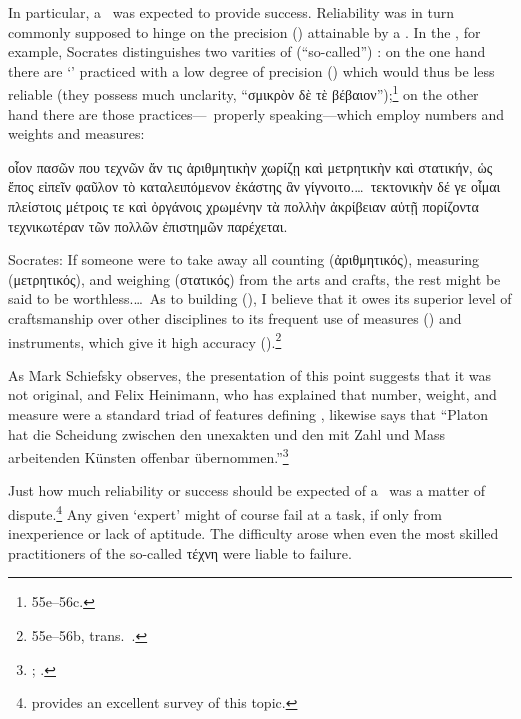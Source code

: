 \documentclass[11pt,letterpaper,oneside]{amsart} %
\begin{document}


In particular, a \techne\ was expected to provide  success. Reliability was in turn commonly supposed to hinge on the precision (\akribeia) attainable by a \techne. In the , for example, Socrates distinguishes two varities of (``so-called'') \technai: on the one hand there are `\technai' practiced with a low degree of precision (\akribeia) which would thus be less reliable (they possess much unclarity, ``σμικρὸν δὲ τὲ βέβαιον'');\footnote{55e--56c.} on the other hand there are those practices---\technai\ properly speaking---which employ numbers and weights and measures:\begin{squote}οἷον πασῶν που τεχνῶν ἄν τις ἀριθμητικὴν χωρίζῃ καὶ μετρητικὴν καὶ στατικήν, ὡς ἔπος εἰπεῖν φαῦλον τὸ καταλειπόμενον ἑκάστης ἂν γίγνοιτο.\ldots\ τεκτονικὴν δέ γε οἶμαι πλείστοις μέτροις τε καὶ ὀργάνοις χρωμένην τὰ πολλὴν ἀκρίβειαν αὐτῇ πορίζοντα τεχνικωτέραν τῶν πολλῶν ἐπιστημῶν παρέχεται.

\vspace{0.05in}

\noindent Socrates: If someone were to take away all counting (ἀριθμητικός), measuring (μετρητικός), and weighing (στατικός) from the arts and crafts, the rest might be said to be worthless.\ldots\ As to building (\tektonikh), I believe that it owes its superior level of craftsmanship over other disciplines to its frequent use of measures (\metra) and instruments, which give it high accuracy (\akribeia).\footnote{55e--56b, trans.\ .}\end{squote} As Mark Schiefsky observes, the presentation of this point suggests that it was not original, and Felix Heinimann, who has explained that number, weight, and measure were a standard triad of features defining \techne, likewise says that ``Platon hat die Scheidung zwischen den unexakten und den mit Zahl und Mass arbeitenden K\"{u}nsten offenbar \"{u}bernommen.''\footnote{\citet[p.\ 15]{schiefsky2005}; \citet[p.\ 194]{heinimann1975mass}.}

Just how much reliability or success should be expected of a \techne\ was a matter of dispute.\footnote{\citet{allen1994} provides an excellent survey of this topic.} Any given `expert' might of course fail at a task, if only from inexperience or lack of aptitude. The difficulty arose when even the most skilled practitioners of the so-called τέχνη were liable to failure.
\end{document}
